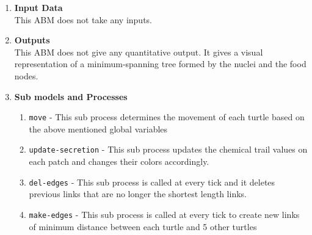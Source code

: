 \documentclass[a4paper, 11pt]{article}
\begin{document}
\begin{enumerate}
    \item \textbf{Input Data} \\
    This ABM does not take any inputs. 
    \item \textbf{Outputs} \\
    This ABM does not give any quantitative output. It gives a visual representation of a minimum-spanning tree formed by the nuclei and the food nodes. 
    \item \textbf{Sub models and Processes}
    \begin{enumerate}
    \item \texttt{move} - This sub process determines the movement of each turtle based on the above mentioned global variables
    \item \texttt{update-secretion} - This sub process updates the chemical trail values on each patch and changes their colors accordingly.
        \item \texttt{del-edges} - This sub process is called at every tick and it deletes previous links that are no longer the shortest length links.
        \item \texttt{make-edges} - This sub process is called at every tick to create new links of minimum distance between each turtle and 5 other turtles
    \end{enumerate}
    \end{enumerate}
\newpage
\end{document}
